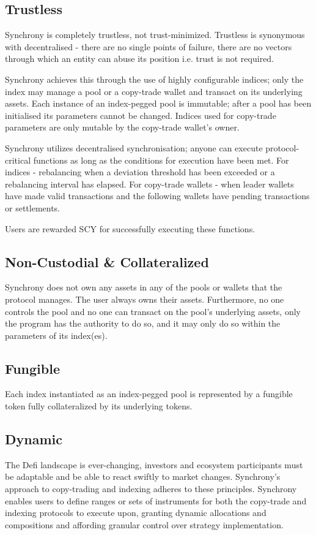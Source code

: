 \documentclass[10pt]{article}
\begin{document}
					\subsection{Trustless}
					Synchrony is completely trustless, not trust-minimized. Trustless is synonymous
					with decentralised - there are no single points of failure, there are no vectors
					through which an entity can abuse its position i.e. trust is not required. \par
					Synchrony achieves this through the use of highly configurable indices; only
					the index may manage a pool or a copy-trade wallet and transact on its
					underlying assets. Each instance of an index-pegged pool is immutable; after
					a pool has been initialised its parameters cannot be changed. Indices used for
					copy-trade parameters are only mutable by the copy-trade wallet's owner.\par
					Synchrony utilizes decentralised synchronisation; anyone can execute
					protocol-critical functions as long as the conditions for execution have been
					met. For indices - rebalancing when a deviation threshold has been exceeded or
					a rebalancing interval has elapsed. For copy-trade wallets - when leader wallets
					have made valid transactions and the following wallets have pending transactions
					or settlements. \par
					Users are rewarded SCY for successfully executing these functions.
					\subsection{Non-Custodial \& Collateralized}
					Synchrony does not own any assets in any of the pools or wallets that the
					protocol manages. The user always owns their assets. Furthermore, no one
					controls the pool and no one can transact on the pool's underlying assets, only
					the program has the authority to do so, and it may only do so within the
					parameters of its index(es).
					\subsection{Fungible}
					Each index instantiated as an index-pegged pool is represented by a fungible
					token fully collateralized by its underlying tokens.
					\subsection{Dynamic}
					The Defi landscape is ever-changing, investors and ecosystem participants must
					be adaptable and be able to react swiftly to market changes. Synchrony's
					approach to copy-trading and indexing adheres to these principles. Synchrony
					enables users to define ranges or sets of instruments for both the copy-trade
					and indexing protocols to execute upon, granting dynamic allocations and
					compositions and affording granular control over strategy implementation.
\end{document}
